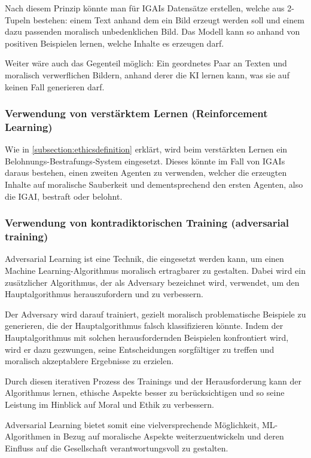 \documentclass[12pt]{article}
\begin{document}
Nach diesem Prinzip könnte man für IGAIs Datensätze erstellen, welche aus 2-Tupeln bestehen: einem Text anhand dem ein Bild erzeugt werden soll und einem dazu passenden moralisch unbedenklichen Bild. 
Das Modell kann so anhand von positiven Beispielen lernen, welche Inhalte es erzeugen darf.

Weiter wäre auch das Gegenteil möglich: Ein geordnetes Paar an Texten und moralisch verwerflichen Bildern, anhand derer die KI lernen kann, was sie auf keinen Fall generieren darf.

\subsubsection{Verwendung von verstärktem Lernen (Reinforcement Learning)}
Wie in \ref{subsection:ethicsdefinition} erklärt, wird beim verstärkten Lernen ein Belohnungs-Bestrafungs-System eingesetzt. Dieses könnte im Fall von IGAIs daraus bestehen, einen zweiten Agenten zu verwenden, welcher die erzeugten Inhalte auf moralische Sauberkeit und dementsprechend den ersten Agenten, also die IGAI, bestraft oder belohnt.

\subsubsection{Verwendung von kontradiktorischen Training (adversarial training)}
Adversarial Learning ist eine Technik, die eingesetzt werden kann, um einen Machine Learning-Algorithmus moralisch ertragbarer zu gestalten. 
Dabei wird ein zusätzlicher Algorithmus, der als Adversary bezeichnet wird, verwendet, um den Hauptalgorithmus herauszufordern und zu verbessern. 

Der Adversary wird darauf trainiert, gezielt moralisch problematische Beispiele zu generieren, die der Hauptalgorithmus falsch klassifizieren könnte. 
Indem der Hauptalgorithmus mit solchen herausfordernden Beispielen konfrontiert wird, wird er dazu gezwungen, seine Entscheidungen sorgfältiger zu treffen und moralisch akzeptablere Ergebnisse zu erzielen. 

Durch diesen iterativen Prozess des Trainings und der Herausforderung kann der Algorithmus lernen, ethische Aspekte besser zu berücksichtigen und so seine Leistung im Hinblick auf Moral und Ethik zu verbessern. 

Adversarial Learning bietet somit eine vielversprechende Möglichkeit, ML-Algorithmen in Bezug auf moralische Aspekte weiterzuentwickeln und deren Einfluss auf die Gesellschaft verantwortungsvoll zu gestalten.
\end{document}
